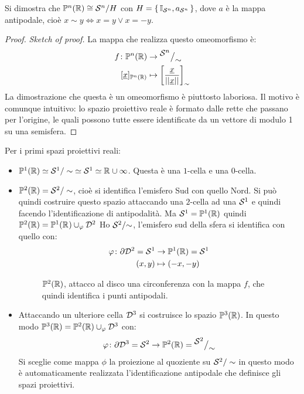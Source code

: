 \begin{lemma}
  Si dimostra che $ \mathbb{P}^{n} (\mathbb{R}) \cong {\mathcal{S}^{n}} \slash {H} $ con $ H = \set{\mathbb{I}_{\mathcal{S}^{n}}, a_{\mathcal{S}^{n}}} $, dove
  $ a $ è la mappa antipodale, cioè $ x \sim y \iff x = y \vee x = - y $.
\end{lemma}
\begin{proof} \emph{Sketch of proof.}
  La mappa che realizza questo omeomorfismo è:
  \begin{align*}
    f \colon \Pjr{n} & \to \quot{\Sph{n}}{\sim}\\
    [\vec{x}]_{\Pjr{n}} & \mapsto \left[\frac{\vec{x}}{||\vec{x}||}\right]_\sim
  \end{align*}
  La dimostrazione che questa è un omeomorfismo è piuttosto laboriosa. Il motivo è
  comunque intuitivo: lo spazio proiettivo reale è formato dalle rette che passano
  per l'origine, le quali possono tutte essere identificate da un vettore di modulo
  1 su una semisfera.
\end{proof}
\eproof
Per i primi spazi proiettivi reali:
\begin{itemize}
\item
  $ \mathbb{P}^{1} (\mathbb{R}) \simeq \mathcal{S}^{1} \slash \sim \; \simeq \mathcal{S}^{1} \simeq \mathbb{R}^{} \cup {\infty} $. Questa è una
  $ 1 $-cella e una $ 0 $-cella.
\item $ \mathbb{P}^{2} (\mathbb{R}) = \mathcal{S}^{2} \slash \sim $, cioè si identifica l'emisfero Sud con quello
  Nord. Si può quindi costruire questo spazio attaccando una $ 2 $-cella
  ad una $ \mathcal{S}^{1} $ e quindi facendo l'identificazione di antipodalità.
  Ma $ \mathcal{S}^{1} = \mathbb{P}^{1} (\mathbb{R}) $ quindi $ \mathbb{P}^{2} (\mathbb{R}) = \mathbb{P}^1(\mathbb{R}^{}) \cup_\varphi \mathcal{D}^{2} $
  Ho $ {\mathcal{S}^{2}} \slash {\sim} $, l'emisfero sud della sfera si identifica con quello
  con:
  \begin{align*}
    \varphi \colon \partial \mathcal{D}^{2} = \mathcal{S}^{1} & \to \mathbb{P}^{1} (\mathbb{R}) = \mathcal{S}^{1} \\
    (x,y) & \mapsto (-x,-y)
  \end{align*}
  \vspace*{-18pt}
  \begin{figure}[htbp]
    \centering
    \caption{$ \mathbb{P}^{2} (\mathbb{R}) $, attacco al disco una circonferenza con la mappa $ f $,
      che quindi identifica i punti antipodali.}
    \label{fig:lez10:projective}
  \end{figure}
\item Attaccando un ulteriore cella $ \mathcal{D}^{3} $ si costruisce lo spazio $ \mathbb{P}^{3} (\mathbb{R}) $.
  In questo modo $ \mathbb{P}^{3} (\mathbb{R}) = \mathbb{P}^{2} (\mathbb{R}) \cup_\varphi \mathcal{D}^{3} $ con:
  \[
    \varphi \colon \partial \mathcal{D}^{3} = \mathcal{S}^{2} \to \mathbb{P}^{2} (\mathbb{R}) = {^{\textstyle \mathcal{S}^{2}}\big/_{\textstyle \sim}}
  \]
  Si sceglie come mappa $ \phi $ la proiezione al quoziente su
  $ \mathcal{S}^{2} \slash \sim $ in questo modo è automaticamente realizzata l'identificazione
  antipodale che definisce gli spazi proiettivi.
\end{itemize}
